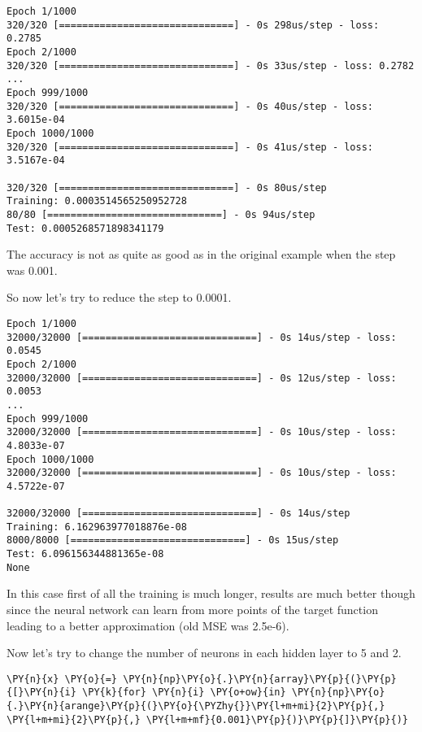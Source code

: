 \begin{Answer}
\begin{codebox}[size=fbox, boxrule=1pt, colback=cellbackground, colframe=cellborder]
\begin{Verbatim}[commandchars=\\\{\}]
Epoch 1/1000
320/320 [==============================] - 0s 298us/step - loss: 0.2785
Epoch 2/1000
320/320 [==============================] - 0s 33us/step - loss: 0.2782
...
Epoch 999/1000
320/320 [==============================] - 0s 40us/step - loss: 3.6015e-04
Epoch 1000/1000
320/320 [==============================] - 0s 41us/step - loss: 3.5167e-04

320/320 [==============================] - 0s 80us/step
Training: 0.0003514565250952728
80/80 [==============================] - 0s 94us/step
Test: 0.0005268571898341179
\end{Verbatim}
\end{codebox}

The accuracy is not as quite as good as in the original example when the step
was 0.001.

So now let's try to reduce the step to 0.0001.
\begin{codebox}[size=fbox, boxrule=1pt, colback=cellbackground, colframe=cellborder]
\begin{Verbatim}[commandchars=\\\{\}]
Epoch 1/1000
32000/32000 [==============================] - 0s 14us/step - loss: 0.0545
Epoch 2/1000
32000/32000 [==============================] - 0s 12us/step - loss: 0.0053
...
Epoch 999/1000
32000/32000 [==============================] - 0s 10us/step - loss: 4.8033e-07
Epoch 1000/1000
32000/32000 [==============================] - 0s 10us/step - loss: 4.5722e-07

32000/32000 [==============================] - 0s 14us/step
Training: 6.162963977018876e-08
8000/8000 [==============================] - 0s 15us/step
Test: 6.096156344881365e-08
None
\end{Verbatim}
\end{codebox}

In this case first of all the training is much longer, results are much
better though since the neural network can learn from more points of the
target function leading to a better approximation (old MSE was 2.5e-6).

Now let's try to change the number of neurons in each hidden layer to 5 and 2.
\begin{codebox}[size=fbox, boxrule=1pt,colback=cellbackground, colframe=cellborder]
\begin{Verbatim}[commandchars=\\\{\}]
\PY{n}{x} \PY{o}{=} \PY{n}{np}\PY{o}{.}\PY{n}{array}\PY{p}{(}\PY{p}{[}\PY{n}{i} \PY{k}{for} \PY{n}{i} \PY{o+ow}{in} \PY{n}{np}\PY{o}{.}\PY{n}{arange}\PY{p}{(}\PY{o}{\PYZhy{}}\PY{l+m+mi}{2}\PY{p}{,} \PY{l+m+mi}{2}\PY{p}{,} \PY{l+m+mf}{0.001}\PY{p}{)}\PY{p}{]}\PY{p}{)}
	

\end{Verbatim}
\end{codebox}
\end{Answer}
